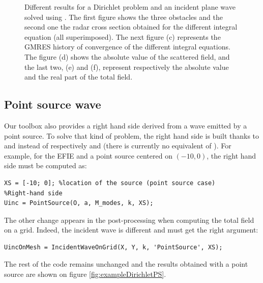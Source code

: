 \begin{figure}
\caption{Different results for a Dirichlet problem and an incident plane wave solved using \mudiff. The first figure shows the three obstacles and the second one the radar cross section obtained for the different integral equation (all superimposed). The next figure (c) represents the GMRES history of convergence of the different integral equations. The figure (d) shows the absolute value of the scattered field, and the last two, (e) and (f), represent respectively the absolute value and the real part of the total field.}
\label{fig:exampleDirichlet}
\end{figure}

\subsection{Point source wave}

Our toolbox \mudiff also provides a right hand side derived from a wave emitted by a point source. To solve that kind of problem, the right hand side is built thanks to \PointSource and \DnPointSource instead of respectively \PlaneWave and \DnPlaneWave (there is currently no equivalent of \PlaneWavePrecond). For example, for the EFIE and a point source centered on $(-10,0)$, the right hand side must be computed as:
\begin{lstlisting}
XS = [-10; 0]; %location of the source (point source case)
%Right-hand side
Uinc = PointSource(O, a, M_modes, k, XS);
\end{lstlisting}
The other change appears in the post-processing when computing the total field on a grid. Indeed, the incident wave is different and \IncidentWaveOnGrid must get the right argument:
\begin{lstlisting}
UincOnMesh = IncidentWaveOnGrid(X, Y, k, 'PointSource', XS);
\end{lstlisting}

The rest of the code remains unchanged and the results obtained with a point source are shown on figure \ref{fig:exampleDirichletPS}.

